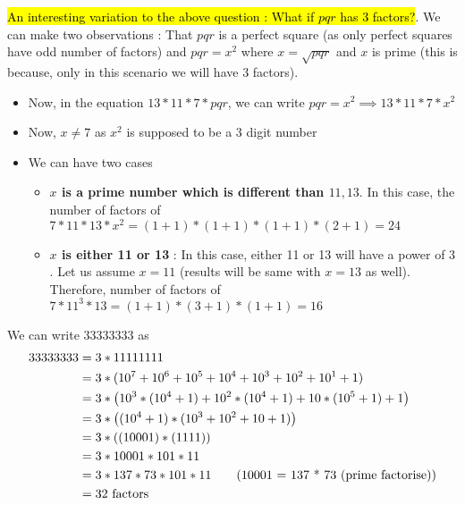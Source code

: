 \begin{EXTRA-LEARNING}
    \hl{An interesting variation to the above question : What if $pqr$ has 3 factors?}. We can make two observations : That $pqr$ is a perfect square (as only perfect squares have odd number of factors) and $pqr = x^2$ where $x = \sqrt{pqr}$ and $x$ is prime (this is because, only in this scenario we will have 3 factors). \\

    \begin{itemize}
        \item Now, in the equation $13 * 11 * 7 * pqr$, we can write $pqr = x^2 \implies 13 * 11 * 7 * x^2$
        
        \item Now, $x \neq 7$ as $x^2$ is supposed to be a 3 digit number
        \item We can have two cases
        \begin{itemize}
            \item \textbf{$x$ is a prime number which is different than $11,13$}. In this case, the number of factors of $7 * 11 * 13 * x^2 = (1+1) * (1+1) * (1+1) * (2+1) = 24$
            \item \textbf{$x$ is either 11 or 13} : In this case, either 11 or 13 will have a power of $3$. Let us assume $x = 11$ (results will be same with $x=13$ as well). Therefore, number of factors of $7 * 11^3 * 13 = (1+1) * (3+1) * (1+1) = 16$
        \end{itemize}
    \end{itemize}
\end{EXTRA-LEARNING}


We can write $33333333$ as 
\begin{align*}
    33333333 &= 3 * 11111111 \\
    &= 3 * ( 10^7 + 10^6 + 10^5 + 10^4 + 10^3 + 10^2 + 10^1 + 1) \\
    &= 3 * \left ( 10^3 * (10^4 + 1) + 10^2 * (10^4 + 1) + 10 * (10^5 + 1) + 1 \right ) \\ 
    &= 3 * \left ( (10^4 + 1) * (10^3 + 10^2 + 10 + 1)  \right ) \\ 
    &= 3 * \left ( (10001) * (1111)  \right ) \\ 
    &= 3 * 10001 * 101 * 11  \\ 
    &= 3 * 137 * 73 * 101 * 11 \tag{10001 = 137 * 73 (prime factorise)} \\ 
    &= 32 \text{ factors} 
\end{align*}

